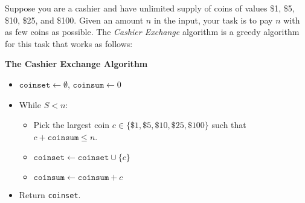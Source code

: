 \documentclass[11pt]{article}
\theoremstyle{definition}
\theoremstyle{theorem}
\begin{document}
Suppose you are a cashier and have unlimited supply of coins of values \$1, \$5, \$10, \$25, and \$100. Given an amount $n$ in the input, your task is to pay $n$ with as few coins as possible. The {\em Cashier Exchange} algorithm is a greedy algorithm for this task that works as follows:

    \begin{tcolorbox}
    \textbf{The Cashier Exchange Algorithm}
    
    \begin{itemize}
        \item $\texttt{coinset} \gets \emptyset$, $\texttt{coinsum} \gets 0$
        \item While $S < n$:
            \begin{itemize}
                \item Pick the largest coin $c \in \{\$1, \$5, \$10, \$25, \$100\}$ such that $c + \texttt{coinsum} \leq n$.
                \item $\texttt{coinset} \gets \texttt{coinset} \cup \{c \}$
                \item $\texttt{coinsum} \gets \texttt{coinsum} + c$
            \end{itemize}
        \item Return \texttt{coinset}.
    \end{itemize}
    \end{tcolorbox}
\end{document}
